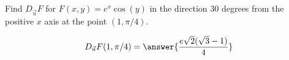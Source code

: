 \documentclass{ximera}
\author{David Guichard \and Neal Koblitz \and H. Jerome Keisler \and Albert Scheller \and Barry Balof \and Mike Wills \and Matthew Carr \and Bart Snapp}
\begin{document}
\begin{exercise}

Find $D_{\vec{u}} F$ for $F(x,y)=e^{x}\cos(y)$ in the direction $30$ degrees from the positive $x$ axis at the point $(1,\pi/4)$. 
\begin{prompt}
\[
D_{\vec{u}}F(1,\pi/4)=\answer{\frac{e\sqrt{2}(\sqrt{3}-1)}{4}}
\]
\end{prompt}

\end{exercise}
\end{document}
